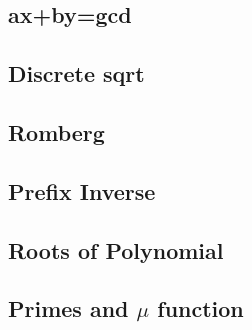 \documentclass[a4paper,10pt,twocolumn,oneside]{article}
\begin{document}
%

\subsection{ax+by=gcd}


\subsection{Discrete sqrt}


%

\subsection{Romberg}


%

\subsection{Prefix Inverse}


\subsection{Roots of Polynomial}


%

\subsection{Primes and $\mu$ function}

\end{document}
